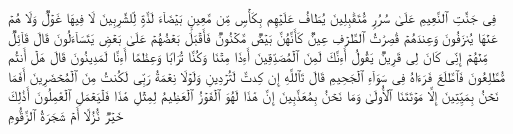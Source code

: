 فِی جَنَّٰتِ ٱلنَّعِیمِ%
\stopbuffer%
\startbuffer[\q:37:44]
عَلَىٰ سُرُرࣲ مُّتَقَٰبِلِینَ%
\stopbuffer%
\startbuffer[\q:37:45]
یُطَافُ عَلَیۡهِم بِكَأۡسࣲ مِّن مَّعِینِۭ%
\stopbuffer%
\startbuffer[\q:37:46]
بَیۡضَاۤءَ لَذَّةࣲ لِّلشَّٰرِبِینَ%
\stopbuffer%
\startbuffer[\q:37:47]
لَا فِیهَا غَوۡلࣱ وَلَا هُمۡ عَنۡهَا یُنزَفُونَ%
\stopbuffer%
\startbuffer[\q:37:48]
وَعِندَهُمۡ قَٰصِرَٰتُ ٱلطَّرۡفِ عِینࣱ%
\stopbuffer%
\startbuffer[\q:37:49]
كَأَنَّهُنَّ بَیۡضࣱ مَّكۡنُونࣱ%
\stopbuffer%
\startbuffer[\q:37:50]
فَأَقۡبَلَ بَعۡضُهُمۡ عَلَىٰ بَعۡضࣲ یَتَسَاۤءَلُونَ%
\stopbuffer%
\startbuffer[\q:37:51]
قَالَ قَاۤئِلࣱ مِّنۡهُمۡ إِنِّی كَانَ لِی قَرِینࣱ%
\stopbuffer%
\startbuffer[\q:37:52]
یَقُولُ أَءِنَّكَ لَمِنَ ٱلۡمُصَدِّقِینَ%
\stopbuffer%
\startbuffer[\q:37:53]
أَءِذَا مِتۡنَا وَكُنَّا تُرَابࣰا وَعِظَٰمًا أَءِنَّا لَمَدِینُونَ%
\stopbuffer%
\startbuffer[\q:37:54]
قَالَ هَلۡ أَنتُم مُّطَّلِعُونَ%
\stopbuffer%
\startbuffer[\q:37:55]
فَٱطَّلَعَ فَرَءَاهُ فِی سَوَاۤءِ ٱلۡجَحِیمِ%
\stopbuffer%
\startbuffer[\q:37:56]
قَالَ تَٱللَّهِ إِن كِدتَّ لَتُرۡدِینِ%
\stopbuffer%
\startbuffer[\q:37:57]
وَلَوۡلَا نِعۡمَةُ رَبِّی لَكُنتُ مِنَ ٱلۡمُحۡضَرِینَ%
\stopbuffer%
\startbuffer[\q:37:58]
أَفَمَا نَحۡنُ بِمَیِّتِینَ%
\stopbuffer%
\startbuffer[\q:37:59]
إِلَّا مَوۡتَتَنَا ٱلۡأُولَىٰ وَمَا نَحۡنُ بِمُعَذَّبِینَ%
\stopbuffer%
\startbuffer[\q:37:60]
إِنَّ هَٰذَا لَهُوَ ٱلۡفَوۡزُ ٱلۡعَظِیمُ%
\stopbuffer%
\startbuffer[\q:37:61]
لِمِثۡلِ هَٰذَا فَلۡیَعۡمَلِ ٱلۡعَٰمِلُونَ%
\stopbuffer%
\startbuffer[\q:37:62]
أَذَٰلِكَ خَیۡرࣱ نُّزُلًا أَمۡ شَجَرَةُ ٱلزَّقُّومِ%
\stopbuffer%
